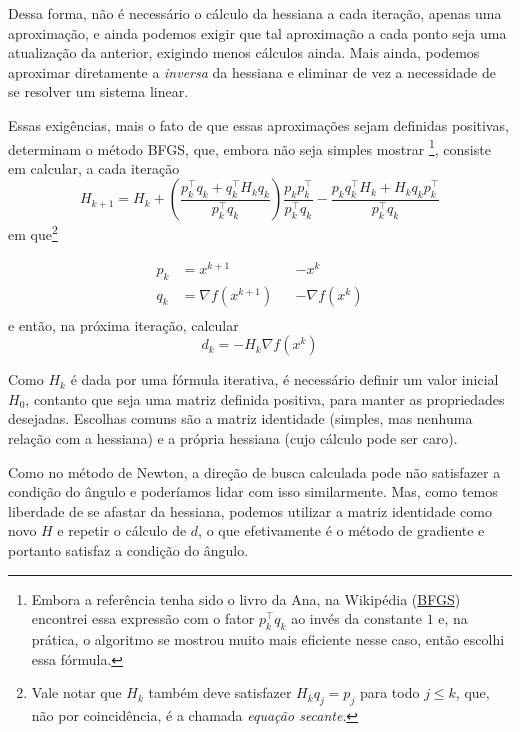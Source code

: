 \documentclass[a4paper,11pt]{article}
\begin{document}
            Dessa forma, não é necessário o cálculo da hessiana a cada iteração, apenas uma aproximação, e ainda podemos exigir que tal aproximação
            a cada ponto seja uma atualização da anterior, exigindo menos cálculos ainda. Mais ainda, podemos aproximar diretamente a \emph{inversa}
            da hessiana e eliminar de vez a necessidade de se resolver um sistema linear.

            Essas exigências, mais o fato de que essas aproximações sejam definidas positivas, determinam o método BFGS, que, embora não seja
            simples mostrar \citep*{Friedlander94} \footnote{Embora a referência tenha sido o livro da Ana, na Wikipédia (\href{https://en.wikipedia.org/wiki/Broyden-Fletcher-Goldfarb-Shanno_algorithm}{BFGS}) encontrei essa expressão com o fator $p_k^\top q_k$ ao invés da constante $1$ e, na prática, o algoritmo se mostrou muito mais eficiente nesse caso, então escolhi essa fórmula.}, consiste em calcular, a cada iteração
                $$ H_{k+1} = H_k + \left( \frac{p_k^\top q_k + q_k^\top H_kq_k}{p_k^\top q_k}\right)\frac{p_kp_k^\top}{p_k^\top q_k} - \frac{p_kq_k^\top H_k + H_kq_kp_k^\top}{p_k^\top q_k}$$
            em que\footnote{Vale notar que $H_k$ também deve satisfazer $H_kq_j = p_j$ para todo $j \leq k$, que, não por coincidência, é a chamada \emph{equação secante}.}

                \begin{equation*}
                    \begin{aligned}
                        p_k &= x^{k+1} & &- x^k \\
                        q_k &= \nabla f(x^{k+1}) & &- \nabla f(x^k) \\
                    \end{aligned}
                \end{equation*}
            e então, na próxima iteração, calcular
                $$ d_k = -H_k\nabla f(x^k) $$

            Como $H_k$ é dada por uma fórmula iterativa, é necessário definir um valor inicial $H_0$, contanto que seja uma matriz definida positiva, para manter as propriedades desejadas. Escolhas comuns são a matriz identidade (simples, mas nenhuma relação com a hessiana) e a própria hessiana (cujo cálculo pode ser caro).

            Como no método de Newton, a direção de busca calculada pode não satisfazer a condição do ângulo e poderíamos lidar com isso similarmente. Mas, como temos liberdade de se afastar da hessiana, podemos utilizar a matriz identidade como novo $H$ e repetir o cálculo de $d$, o que efetivamente é o método de gradiente e portanto satisfaz a condição do ângulo.
\end{document}

